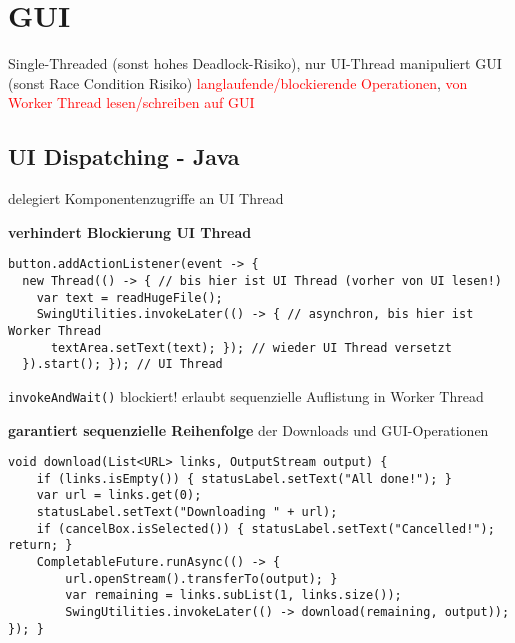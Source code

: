 \section{GUI}

Single-Threaded (sonst hohes Deadlock-Risiko), nur UI-Thread manipuliert GUI (sonst Race Condition Risiko) \textcolor{red}{langlaufende/blockierende Operationen}, \textcolor{red}{von Worker Thread lesen/schreiben auf GUI}

\subsection{UI Dispatching - Java}
delegiert Komponentenzugriffe an UI Thread

\textbf{verhindert Blockierung UI Thread}
\begin{lstlisting}
button.addActionListener(event -> {
  new Thread(() -> { // bis hier ist UI Thread (vorher von UI lesen!)
    var text = readHugeFile();
    SwingUtilities.invokeLater(() -> { // asynchron, bis hier ist Worker Thread
      textArea.setText(text); }); // wieder UI Thread versetzt
  }).start(); }); // UI Thread
\end{lstlisting}

\lstinline{invokeAndWait()} blockiert! erlaubt sequenzielle Auflistung in Worker Thread

\textbf{garantiert sequenzielle Reihenfolge} der Downloads und GUI-Operationen
\begin{lstlisting}
void download(List<URL> links, OutputStream output) {
    if (links.isEmpty()) { statusLabel.setText("All done!"); }
    var url = links.get(0);
    statusLabel.setText("Downloading " + url);
    if (cancelBox.isSelected()) { statusLabel.setText("Cancelled!"); return; }
    CompletableFuture.runAsync(() -> {
        url.openStream().transferTo(output); }
        var remaining = links.subList(1, links.size());
        SwingUtilities.invokeLater(() -> download(remaining, output)); }); }
\end{lstlisting}

